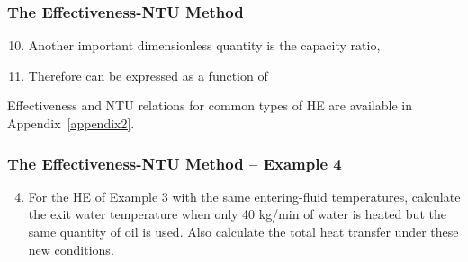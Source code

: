 \documentclass[10pt,compress,handout,ignorenonframetext,unknownkeysallowed]{beamer}
\begin{document}
\begin{frame}
  \frametitle{The Effectiveness-NTU Method}
     \begin{enumerate}\setcounter{enumi}{9}
          \item<1-> Another important dimensionless quantity is the capacity ratio,
          \item<2-> Therefore  can be expressed as a function of
         
     \end{enumerate}
 
     Effectiveness and NTU relations for common types of HE are available in Appendix~\ref{appendix2}.

\end{frame}

\begin{frame}
  \frametitle{ The Effectiveness-NTU Method -- Example 4}
      \begin{enumerate}\setcounter{enumi}{3}
         \item For the HE of Example 3 with the same entering-fluid temperatures, calculate the exit water temperature when only 40 kg/min of water is heated but the same quantity of oil is used. Also calculate the total heat transfer under these new conditions.
      \end{enumerate}
\end{frame}
\end{document}
